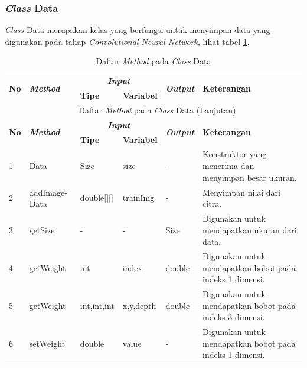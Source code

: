 \subsubsection{\textit{Class} Data}
\noindent \textit{Class} Data merupakan kelas yang berfungsi untuk menyimpan data yang digunakan pada tahap \textit{Convolutional Neural Network}, lihat tabel \ref{tbl:classData}.
\begingroup
\setlength{\LTleft}{-20cm plus -1fill}
\setlength{\LTright}{\LTleft}
\begin{small}
\begin{longtable}{|p{0.4cm}|p{2cm}|p{1.8cm}|p{1.8cm}|p{1.7cm}|p{3.55cm}|}
	\caption{Daftar \textit{Method} pada \textit{Class} Data \label{tbl:classData}}\\
	\hline
	\multirow{2}{*}{\textbf{No}} & \multirow{2}{*}{\textit{\textbf{Method}}} & \multicolumn{2}{c|}{\textit{\textbf{Input}}} & \multirow{2}{*}{\textit{\textbf{Output}}} & 
	\multirow{2}{*}{\textbf{Keterangan}}\\
	\cline{3-4}
	& & \textbf{Tipe} & \textbf{Variabel} & & \\
	\endfirsthead
	\multicolumn{6}{c}{\textbf{\tablename~\thetable} Daftar \textit{Method} pada \textit{Class} Data (Lanjutan)} \\
	\hline
	\multirow{2}{*}{\textbf{No}} & \multirow{2}{*}{\textit{\textbf{Method}}} & \multicolumn{2}{c|}{\textit{\textbf{Input}}} & \multirow{2}{*}{\textit{\textbf{Output}}} & 
	\multirow{2}{*}{\textbf{Keterangan}}\\
	\cline{3-4}
	& & \textbf{Tipe} & \textbf{Variabel} & & \\
	\endhead
	\hline
	1 & Data & Size & size & - & Konstruktor yang menerima dan menyimpan besar ukuran.\\
	\hline
	2 & addImage-\newline Data & double[][] & trainImg & - & Menyimpan nilai dari citra.\\
	\hline
	3 & getSize & - & - & Size & Digunakan untuk mendapatkan ukuran dari data.\\
	\hline
	4 & getWeight & int & index & double & Digunakan untuk mendapatkan bobot pada indeks 1 dimensi.\\
	\hline
	5 & getWeight & int,\newline int,\newline int & x,\newline y,\newline depth & double & Digunakan untuk mendapatkan bobot pada indeks 3 dimensi.\\
	\hline
	6 & setWeight & double & value & - & Digunakan untuk mendapatkan bobot pada indeks 1 dimensi.\\

\end{longtable}
\end{small}

